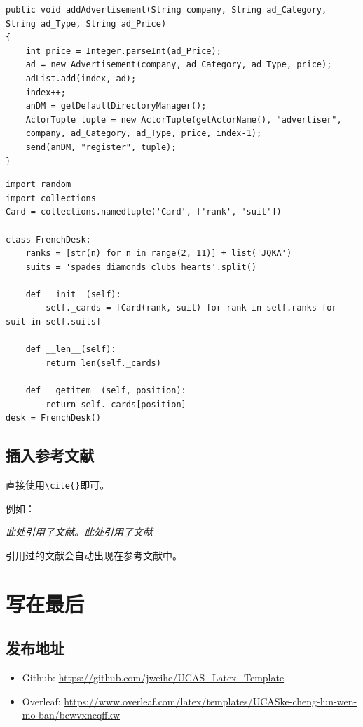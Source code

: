 \documentclass[12pt,hyperref,a4paper,UTF8]{ctexart}
\begin{document}
\begin{lstlisting}[style=Java, title="Java代码"]
public void addAdvertisement(String company, String ad_Category, String ad_Type, String ad_Price)
{
    int price = Integer.parseInt(ad_Price);
    ad = new Advertisement(company, ad_Category, ad_Type, price);
    adList.add(index, ad);
    index++;
    anDM = getDefaultDirectoryManager();
    ActorTuple tuple = new ActorTuple(getActorName(), "advertiser",
    company, ad_Category, ad_Type, price, index-1);
    send(anDM, "register", tuple);
}
\end{lstlisting}

\begin{lstlisting}[style=Python, title="Python代码"]                
import random
import collections
Card = collections.namedtuple('Card', ['rank', 'suit'])

class FrenchDesk:
    ranks = [str(n) for n in range(2, 11)] + list('JQKA')
    suits = 'spades diamonds clubs hearts'.split()
    
    def __init__(self):
        self._cards = [Card(rank, suit) for rank in self.ranks for suit in self.suits]
        
    def __len__(self):
        return len(self._cards)
        
    def __getitem__(self, position):
        return self._cards[position]
desk = FrenchDesk()
\end{lstlisting}

\subsection{插入参考文献}
直接使用\verb|\cite{}|即可\cite{DBLP:conf/nips/VaswaniSPUJGKP17}。

例如：


   \textit{ 此处引用了文献\cite{0Isaac}。此处引用了文献\cite{2016The}}


引用过的文献会自动出现在参考文献中。

\section{写在最后}
\subsection{发布地址}
\begin{itemize}
    \item Github: \url{https://github.com/jweihe/UCAS_Latex_Template}
    \item Overleaf:  \url{https://www.overleaf.com/latex/templates/UCASke-cheng-lun-wen-mo-ban/bcwvxncqffkw}
\end{itemize}



\end{document}
